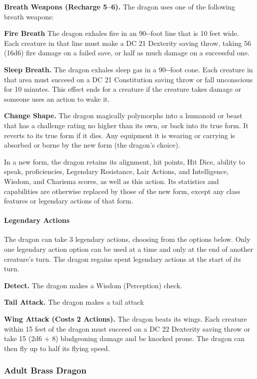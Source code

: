\documentclass[
]{article}
\begin{document}
\textbf{Breath Weapons (Recharge 5--6).} The dragon uses one of the
following breath weapons:

\textbf{Fire Breath} The dragon exhales fire in an 90-­‐foot line that
is 10 feet wide. Each creature in that line must make a DC 21 Dexterity
saving throw, taking 56 (16d6) fire damage on a failed save, or half as
much damage on a successful one.

\textbf{Sleep Breath.} The dragon exhales sleep gas in a 90-­‐foot cone.
Each creature in that area must succeed on a DC 21 Constitution saving
throw or fall unconscious for 10 minutes. This effect ends for a
creature if the creature takes damage or someone uses an action to wake
it.

\textbf{Change Shape.} The dragon magically polymorphs into a humanoid
or beast that has a challenge rating no higher than its own, or back
into its true form. It reverts to its true form if it dies. Any
equipment it is wearing or carrying is absorbed or borne by the new form
(the dragon's choice).

In a new form, the dragon retains its alignment, hit points, Hit Dice,
ability to speak, proficiencies, Legendary Resistance, Lair Actions, and
Intelligence, Wisdom, and Charisma scores, as well as this action. Its
statistics and capabilities are otherwise replaced by those of the new
form, except any class features or legendary actions of that form.

\hypertarget{legendary-actions-10}{%
\paragraph{Legendary Actions}\label{legendary-actions-10}}

The dragon can take 3 legendary actions, choosing from the options
below. Only one legendary action option can be used at a time and only
at the end of another creature's turn. The dragon regains spent
legendary actions at the start of its turn.

\textbf{Detect.} The dragon makes a Wisdom (Perception) check.

\textbf{Tail Attack.} The dragon makes a tail attack

\textbf{Wing Attack (Costs 2 Actions).} The dragon beats its wings. Each
creature within 15 feet of the dragon must succeed on a DC 22 Dexterity
saving throw or take 15 (2d6 + 8) bludgeoning damage and be knocked
prone. The dragon can then fly up to half its flying speed.

\hypertarget{adult-brass-dragon}{%
\subsubsection{Adult Brass Dragon}\label{adult-brass-dragon}}
\end{document}
